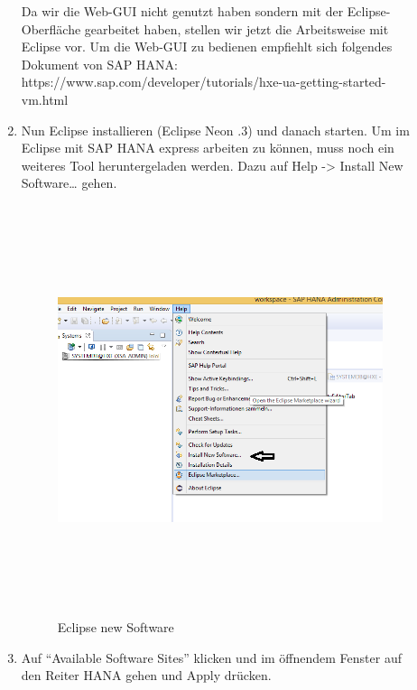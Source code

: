 \documentclass[a4paper, 12pt]{scrartcl}
\begin{document}
\begin{description}
\begin{enumerate}
      
      Da wir die Web-GUI nicht genutzt haben sondern mit der Eclipse-Oberfläche gearbeitet haben, stellen wir jetzt die Arbeitsweise mit Eclipse vor. Um die Web-GUI zu bedienen empfiehlt sich folgendes Dokument von SAP HANA: https://www.sap.com/developer/tutorials/hxe-ua-getting-started-vm.html
      \item Nun Eclipse installieren (Eclipse Neon .3) und danach starten. Um im Eclipse mit SAP HANA express arbeiten zu können, muss noch ein weiteres Tool heruntergeladen werden. Dazu auf Help -> Install New Software… gehen. 

\begin{figure}[H]
\centering
\includegraphics[height=12cm, width=15cm, keepaspectratio]{Hana7.png}
\caption{Eclipse new Software}
\end{figure}    

      \item Auf "`Available Software Sites"' klicken und im öffnendem Fenster auf den Reiter HANA gehen und Apply drücken.


\end{enumerate}
\end{description}
\end{document}
